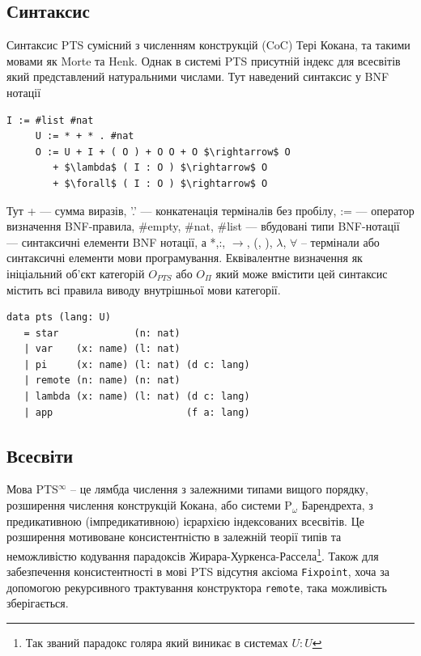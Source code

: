 \newpage
\subsection{Синтаксис}

Синтаксис PTS сумісний з численням конструкцій (CoC) Тері Кокана,
та такими мовами як Morte та Henk.
Однак в системі PTS присутній індекс для всесвітів який
представлений натуральними числами. Тут наведений синтаксис у BNF нотації

\begin{lstlisting}[mathescape=true]
     I := #list #nat
     U := * + * . #nat
     O := U + I + ( O ) + O O + O $\rightarrow$ O
        + $\lambda$ ( I : O ) $\rightarrow$ O
        + $\forall$ ( I : O ) $\rightarrow$ O
\end{lstlisting}

Тут + --- сумма виразів, '.' --- конкатенація терміналів без пробілу,
:= --- оператор визначення BNF-правила, \#empty, \#nat, \#list --- вбудовані типи BNF-нотації
--- синтаксичні елементи BNF нотації,
а *,:, $\rightarrow$, (, ), $\lambda$, $\forall$ -- термінали або синтаксичні елементи мови програмування.
Еквівалентне визначення як ініціальний об'єкт категорій $O_{PTS}$ або $O_\Pi$
який може вмістити цей синтаксис містить всі правила виводу
внутрішньої мови категорії.

\begin{lstlisting}[mathescape=true]
data pts (lang: U)
   = star             (n: nat)
   | var    (x: name) (l: nat)
   | pi     (x: name) (l: nat) (d c: lang)
   | remote (n: name) (n: nat)
   | lambda (x: name) (l: nat) (d c: lang)
   | app                       (f a: lang)
\end{lstlisting}


\subsection{Всесвіти}

Мова PTS$^\infty$ -- це лямбда числення з залежними типами вищого порядку,
розширення числення конструкцій Кокана, або системи P$_\omega$ Барендрехта,
з предикативною (імпредикативною) ієрархією індексованих всесвітів.
Це розширення мотивоване консистентністю\cite{Lof75} в залежній теорії типів та
неможливістю кодування парадоксів Жирара-Хуркенса-Рассела\footnote{Так званий парадокс голяра який виникає в системах $U : U$}. Також для
забезпечення консистентності в мові PTS відсутня аксіома \lstinline{Fixpoint}, хоча
за допомогою рекурсивного трактування конструктора \lstinline{remote},
така можливість зберігається.

